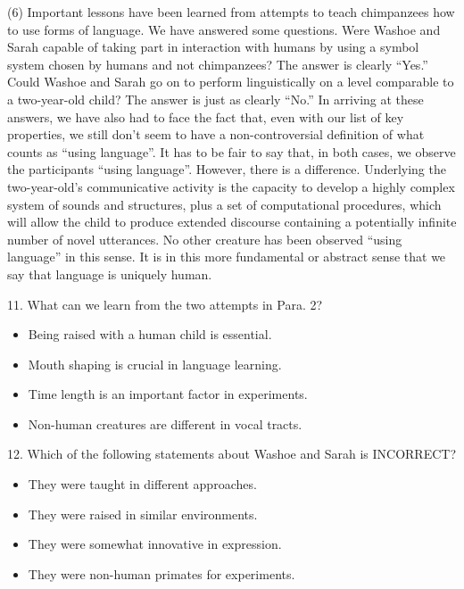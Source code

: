 \documentclass[UTF8,11pt]{ctexart}
\begin{document}
(6) Important lessons have been learned from attempts to teach chimpanzees how to use forms of language. We have answered some questions. Were Washoe and Sarah capable of taking part in interaction with humans by using a symbol system chosen by humans and not chimpanzees? The answer is clearly “Yes.” Could Washoe and Sarah go on to perform linguistically on a level comparable to a two-year-old child? The answer is just as clearly “No.” In arriving at these answers, we have also had to face the fact that, even with our list of key properties, we still don’t seem to have a non-controversial definition of what counts as “using language”. It has to be fair to say that, in both cases, we observe the participants “using language”. However, there is a difference. Underlying the two-year-old’s communicative activity is the capacity to develop a highly complex system of sounds and structures, plus a set of computational procedures, which will allow the child to produce extended discourse containing a potentially infinite number of novel utterances. No other creature has been observed “using language” in this sense. It is in this more fundamental or abstract sense that we say that language is uniquely human.


11. What can we learn from the two attempts in Para. 2?


\begin{itemize}[leftmargin=2em,itemsep=.2em,topsep=.4em]\item[A.] Being raised with a human child is essential.
\item[B.] Mouth shaping is crucial in language learning.
\item[C.] Time length is an important factor in experiments.
\item[D.] Non-human creatures are different in vocal tracts.
\end{itemize}

12. Which of the following statements about Washoe and Sarah is INCORRECT?


\begin{itemize}[leftmargin=2em,itemsep=.2em,topsep=.4em]\item[A.] They were taught in different approaches.
\item[B.] They were raised in similar environments.
\item[C.] They were somewhat innovative in expression.
\item[D.] They were non-human primates for experiments.
\end{itemize}
\end{document}
